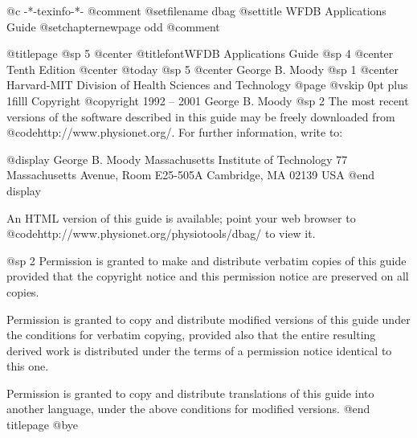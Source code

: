   @c -*-texinfo-*-
@comment %
@setfilename dbag
@settitle WFDB Applications Guide
@setchapternewpage odd
@comment %

@titlepage
@sp 5
@center @titlefont{WFDB Applications Guide}
@sp 4
@center Tenth Edition
@center @today
@sp 5
@center George B. Moody
@sp 1
@center Harvard-MIT Division of Health Sciences and Technology
@page
@vskip 0pt plus 1filll
Copyright @copyright{} 1992 -- 2001 George B. Moody
@sp 2
The most recent versions of the software described in this guide may be
freely downloaded from @code{http://www.physionet.org/}. For further
information, write to:

@display
George B. Moody
Massachusetts Institute of Technology
77 Massachusetts Avenue, Room E25-505A
Cambridge, MA 02139
USA
@end display

An HTML version of this guide is available;  point your web browser to
@code{http://www.physionet.org/physiotools/dbag/} to view it.



@sp 2
Permission is granted to make and distribute verbatim copies of this
guide provided that the copyright notice and this permission notice are
preserved on all copies.

Permission is granted to copy and distribute modified versions of this
guide under the conditions for verbatim copying, provided also that the
entire resulting derived work is distributed under the terms of a
permission notice identical to this one.

Permission is granted to copy and distribute translations of this guide
into another language, under the above conditions for modified versions.
@end titlepage
@bye
